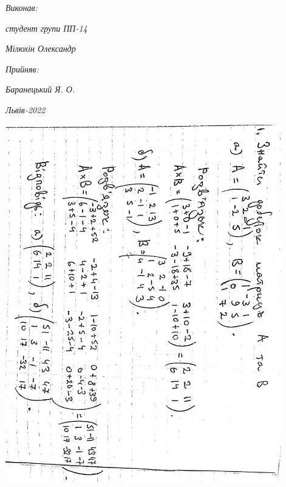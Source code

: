 \documentclass{article}
\begin{document}
\vspace{12.1pt} %
	{\fontsize{14}{22.4}\selectfont
\begin{flushright}
	\textit{Виконав:}

	\textit{студент групи ПП-14}

	\textit{Мілюхін Олександр}

	\textit{Прийняв:}

	\textit{Баранецький Я. О.}
\end{flushright}
\vspace{37.4pt} %
\begin{center}
\textit{Львів-2022}
\vspace{37.4pt} %
\end{center}
	}
\includegraphics[width=12cm,angle=90]{ons/1.jpg}\\
\end{document}
